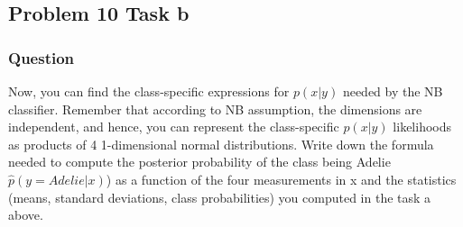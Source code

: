 \documentclass[
]{article}
\newenvironment{Shaded}{\begin{snugshade}}{\end{snugshade}}
\newcommand{\CommentTok}[1]{\textcolor[rgb]{0.56,0.35,0.01}{\textit{#1}}}
\newcommand{\DecValTok}[1]{\textcolor[rgb]{0.00,0.00,0.81}{#1}}
\newcommand{\DocumentationTok}[1]{\textcolor[rgb]{0.56,0.35,0.01}{\textbf{\textit{#1}}}}
\newcommand{\FunctionTok}[1]{\textcolor[rgb]{0.13,0.29,0.53}{\textbf{#1}}}
\newcommand{\NormalTok}[1]{#1}
\newcommand{\OtherTok}[1]{\textcolor[rgb]{0.56,0.35,0.01}{#1}}
\newcommand{\SpecialCharTok}[1]{\textcolor[rgb]{0.81,0.36,0.00}{\textbf{#1}}}
\begin{document}
\begin{Shaded}
\end{Shaded}

\begin{Shaded}
\end{Shaded}

\hypertarget{problem-10-task-b}{%
\subsection{Problem 10 Task b}\label{problem-10-task-b}}

\hypertarget{question-3}{%
\subsubsection{Question}\label{question-3}}

Now, you can find the class-specific expressions for \(p(x|y)\) needed
by the NB classifier. Remember that according to NB assumption, the
dimensions are independent, and hence, you can represent the
class-specific \(p(x|y)\) likelihoods as products of 4 1-dimensional
normal distributions. Write down the formula needed to compute the
posterior probability of the class being Adelie
\(\hat{p}(y = Adelie | x)\)) as a function of the four measurements in x
and the statistics (means, standard deviations, class probabilities) you
computed in the task a above.
\end{document}

